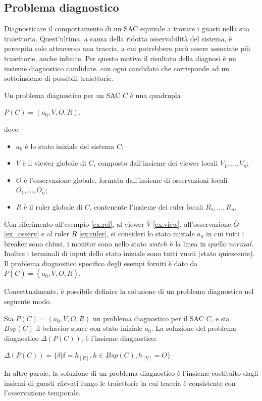\subsection{Problema diagnostico}
Diagnosticare il comportamento di un SAC equivale a trovare i guasti nella sua traiettoria. Quest'ultima, a causa della ridotta osservabilità del sistema, è percepita solo attraverso una traccia, a cui potrebbero però essere associate più traiettorie, anche infinite. Per questo motivo il risultato della diagnosi è un insieme diagnostico candidate, con ogni candidato che corrisponde ad un sottoinsieme di possibili traiettorie. 
\begin{defn}
Un problema diagnostico per un SAC $C$ è una quadrupla
\begin{center}
$P(C) = (a_0,V,O,R)$,
\end{center}
dove:
\begin{itemize}
\item $a_0$ è lo stato iniziale del sistema $C$;
\item $V$ è il viewer globale di $C$, composto dall'insieme dei viewer locali $V_1, \ldots, V_n$;
\item $O$ è l'osservazione globale, formata dall'insieme di osservazioni locali $O_1, \ldots, O_n$;
\item $R$ è il ruler globale di $C$, contenente l'insieme dei ruler locali $R_1, \ldots, R_n$.
\end{itemize}
\end{defn}

\begin{ex} \label{ex:prob_diagn}
Con riferimento all'esempio \ref{ex:ref}, al viewer $\overline{V}$ \ref{ex:view}, all'osservazione $\overline{O}$ \ref{ex_osserv} e al ruler $\overline{R}$ \ref{ex:ruler}, si consideri lo stato iniziale $a_0$ in cui tutti i breaker sono chiusi, i monitor sono nello stato $watch$ è la linea in quello $normal$. Inoltre i terminali di input dello stato iniziale sono tutti vuoti (stato quiescente).
Il problema diagnostico specifico degli esempi forniti è dato da $P(\overline{C}) = (a_0,\overline{V},\overline{O},\overline{R})$.
\end{ex}

Concettualmente, è possibile definire la soluzione di un problema diagnostico nel seguente modo.
\begin{defn}
Sia $P(C) = (a_0,V,O,R)$ un problema diagnostico per il SAC $C$, e sia $Bsp(C)$ il behavior space con stato iniziale $a_0$. La soluzione del problema diagnostico $\Delta(P(C))$, è l'insieme diagnostico:
\begin{center}
	$\Delta(P(C)) = \{ \delta | \delta = h_{[R]}, h \in Bsp(C), h_{[V]} = O\}$
\end{center}
\end{defn}
In altre parole, la soluzione di un problema diagnostico è l'insieme costituito dagli insiemi di guasti rilevati lungo le traiettorie la cui traccia è consistente con l'osservazione temporale.


